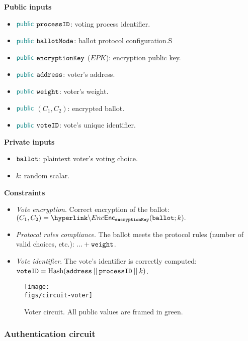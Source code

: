 \begin{spacing}{1.25}
	\vspace{0.3cm}
	\noi \textbf{Public inputs}
	\begin{itemize}
		\item ${\sf\color{teal}public}$ $\texttt{processID}$: voting process identifier. 
		\item ${\sf\color{teal}public}$ $\texttt{ballotMode}$: ballot protocol configuration.S
		\item ${\sf\color{teal}public}$ $\texttt{encryptionKey}$ ($EPK$): encryption public key.
		\item ${\sf\color{teal}public}$ $\texttt{address}$: voter's address.
		\item ${\sf\color{teal}public}$ $\texttt{weight}$: voter's weight.
		\item ${\sf\color{teal}public}$ $(C_1, C_2)$: encrypted ballot. 
		\item ${\sf\color{teal}public}$ $\texttt{voteID}$: vote's unique identifier. 
	\end{itemize}
	\textbf{Private inputs}
	\begin{itemize}								
		\item \private $\texttt{ballot}$: plaintext voter's voting choice.
		\item \private $k$: random scalar.
	\end{itemize}
	\textbf{Constraints}
	\begin{itemize}								
		\item \emph{Vote encryption}. Correct encryption of the ballot: $(C_1, C_2) = \hlget{\Enc}_{\epk}(\ballot; k).$
		\item \emph{Protocol rules compliance}. The ballot meets the protocol rules (number of valid choices, etc.): $... + \texttt{weight}$.
		\item \emph{Vote identifier}. The vote's identifier is correctly computed: $\texttt{voteID} = \text{Hash} (\texttt{address} \:||\: \texttt{processID} \:||\: k)$.
	\end{itemize}
	\vspace{-0.3cm}
\end{spacing}

\begin{figure}[H]
	\centerline{\texttt{[image: \\figs/circuit-voter]}}
	\caption{Voter circuit. All public values are framed in green.}
	\label{fig:circuit-voter}
\end{figure}

\newpage
\subsubsection{Authentication circuit}
\label{sec:vocdoni-protocol:circuits:authentication}

